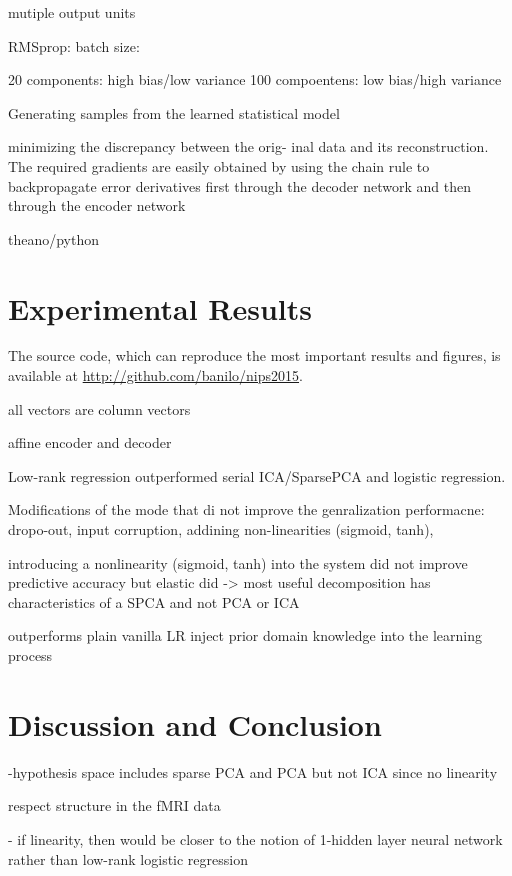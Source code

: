 \documentclass{article} %
\begin{document}
mutiple output units


RMSprop:
batch size: 

20 components: high bias/low variance
100 compoentens: low bias/high variance


Generating samples from the learned statistical model

minimizing the discrepancy between the orig- inal data and its reconstruction.
The required gradients are easily obtained by using the chain rule to
backpropagate error derivatives first through the decoder network
and then through the encoder network 

theano/python



\section{Experimental Results}
The source code, which can reproduce the most important results and
figures, is available at \url{http://github.com/banilo/nips2015}.

all vectors are column vectors

affine encoder and decoder

Low-rank regression outperformed serial ICA/SparsePCA and logistic regression.






Modifications of the mode that di not improve the genralization performacne:
dropo-out, input corruption, addining non-linearities (sigmoid, tanh),


introducing a
nonlinearity (sigmoid, tanh) into the system did not improve predictive accuracy but
elastic did -> most useful decomposition has characteristics of a SPCA
and not PCA or ICA

outperforms plain vanilla LR
inject prior domain knowledge into the learning process





\section{Discussion and Conclusion}
%

-hypothesis space includes sparse PCA and PCA but not ICA since no
linearity

respect structure in the fMRI data


- if linearity, then would be closer to the notion of 1-hidden layer neural
network rather than low-rank logistic regression
\end{document}

